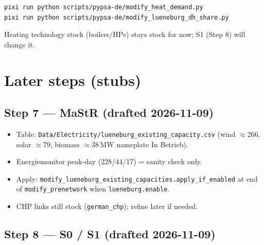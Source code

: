 \documentclass[11pt,a4paper]{article}
\begin{document}
\begin{lstlisting}
pixi run python scripts/pypsa-de/modify_heat_demand.py
pixi run python scripts/pypsa-de/modify_lueneburg_dh_share.py
\end{lstlisting}

Heating technology stock (boilers/HPs) stays stock for now; S1 (Step 8) will change it.

\section{Later steps (stubs)}

\subsection{Step 7 --- MaStR (drafted 2026-11-09)}

\noindent{}

\begin{itemize}[leftmargin=*]
  \item Table: \texttt{Data/Electricity/lueneburg\_existing\_capacity.csv}
        (wind $\approx$266, solar $\approx$79, biomass $\approx$38\,MW nameplate In Betrieb).
  \item Energiemonitor peak-day (228/44/17) = sanity check only.
  \item Apply: \texttt{modify\_lueneburg\_existing\_capacities.apply\_if\_enabled}
        at end of \texttt{modify\_prenetwork} when \texttt{lueneburg.enable}.
  \item CHP links still stock (\texttt{german\_chp}); refine later if needed.
\end{itemize}

\subsection{Step 8 --- S0 / S1 (drafted 2026-11-09)}

\noindent{}
\end{document}
